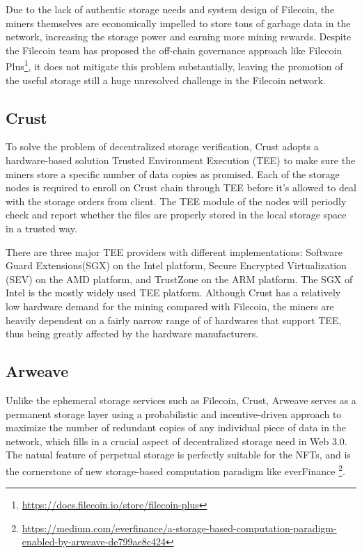 \documentclass[]{article}
\begin{document}
Due to the lack of authentic storage needs and system design of Filecoin, the miners themselves are economically impelled to store tons of garbage data in the network, increasing the storage power and earning more mining rewards. Despite the Filecoin team has proposed the off-chain governance approach like Filecoin Plus\footnote{\url{https://docs.filecoin.io/store/filecoin-plus}}, it does not mitigate this problem substantially, leaving the promotion of the useful storage still a huge unresolved challenge in the Filecoin network.

\subsection{Crust}

To solve the problem of decentralized storage verification, Crust\cite{ref2} adopts a hardware-based solution Trusted Environment Execution (TEE) to make sure the miners store a specific number of data copies as promised. Each of the storage nodes is required to enroll on Crust chain through TEE before it's allowed to deal with the storage orders from client. The TEE module of the nodes will periodly check and report whether the files are properly stored in the local storage space in a trusted way.

There are three major TEE providers with different implementations: Software Guard Extensions(SGX) on the Intel platform, Secure Encrypted Virtualization (SEV) on the AMD platform, and TrustZone on the ARM platform. The SGX of Intel is the mostly widely used TEE platform. Although Crust has a relatively low hardware demand for the mining compared with Filecoin, the miners are heavily dependent on a fairly narrow range of of hardwares that support TEE, thus being greatly affected by the hardware manufacturers.

\subsection{Arweave}

Unlike the ephemeral storage services such as Filecoin, Crust, Arweave\cite{ref3} serves as a permanent storage layer using a probabilistic and incentive-driven approach to maximize the number of redundant copies of any individual piece of data in the network, which fills in a crucial aspect of decentralized storage need in Web 3.0. The natual feature of perpetual storage is perfectly suitable for the NFTs, and is the cornerstone of new storage-based computation paradigm like everFinance \footnote{\url{https://medium.com/everfinance/a-storage-based-computation-paradigm-enabled-by-arweave-de799ae8c424}}.
\end{document}
